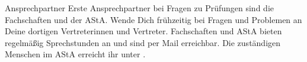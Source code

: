 \begin{artikel}{Ansprechpartner}
Erste Ansprechpartner bei Fragen zu Prüfungen sind die Fachschaften und der AStA. Wende Dich frühzeitig bei Fragen und Problemen an Deine dortigen Vertreterinnen und Vertreter. Fachschaften und AStA bieten regelmäßig Sprechstunden an und sind per Mail erreichbar. Die zuständigen Menschen im AStA erreicht ihr unter .
\end{artikel}
